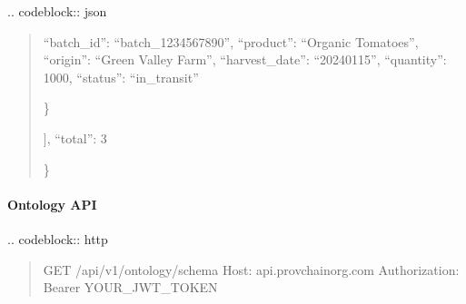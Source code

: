\documentclass[letterpaper,10pt,english]{sphinxmanual}
\begin{document}
\sphinxAtStartPar
{}
.. code\sphinxhyphen{}block:: json
\begin{quote}
\begin{description}
\sphinxlineitem{\{}\begin{description}
\sphinxlineitem{“results”: {[}}\begin{description}
\sphinxlineitem{\{}
\sphinxAtStartPar
“batch\_id”: “batch\_1234567890”,
“product”: “Organic Tomatoes”,
“origin”: “Green Valley Farm”,
“harvest\_date”: “2024\sphinxhyphen{}01\sphinxhyphen{}15”,
“quantity”: 1000,
“status”: “in\_transit”

\end{description}

\sphinxAtStartPar
\}

\end{description}

\sphinxAtStartPar
{]},
“total”: 3

\end{description}

\sphinxAtStartPar
\}
\end{quote}


\paragraph{Ontology API}
\label{\detokenize{api/index:ontology-api}}
\sphinxAtStartPar
{}
.. code\sphinxhyphen{}block:: http
\begin{quote}

\sphinxAtStartPar
GET /api/v1/ontology/schema
Host: api.provchain\sphinxhyphen{}org.com
Authorization: Bearer YOUR\_JWT\_TOKEN
\end{quote}
\end{document}
